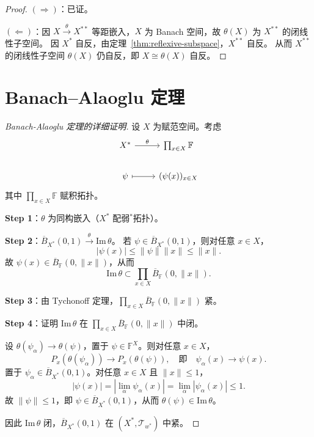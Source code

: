 \documentclass[lang=cn,a4paper,newtx,section]{elegantbook}
\begin{document}
\begin{proof}
  $(\Rightarrow)$：已证。

  $(\Leftarrow)$：因 $X\xrightarrow{\theta}X^{**}$ 等距嵌入，$X$ 为 Banach 空间，故 $\theta(X)$ 为 $X^{**}$ 的闭线性子空间。
  因 $X^*$ 自反，由定理~\ref{thm:reflexive-subspace}，$X^{**}$ 自反。
  从而 $X^{**}$ 的闭线性子空间 $\theta(X)$ 仍自反，即 $X\cong\theta(X)$ 自反。
\end{proof}

\section{Banach--Alaoglu 定理}

\begin{proof}[Banach-Alaoglu 定理的详细证明]
  设 $X$ 为赋范空间。考虑
  \[
    \begin{tikzcd}
      X^* \arrow[r,"\theta"] & \prod_{x\in X}\mathbb{F} \\
      \psi \arrow[r,mapsto] & (\psi(x))_{x\in X}
    \end{tikzcd}
  \]
  其中 $\prod_{x\in X}\mathbb{F}$ 赋积拓扑。

  \textbf{Step 1}：$\theta$ 为同构嵌入（$X^*$ 配弱$^*$拓扑）。

  \textbf{Step 2}：$\overline{B}_{X^*}(0,1)\xrightarrow{\theta}\mathrm{Im}\,\theta$。
  若 $\psi\in\overline{B}_{X^*}(0,1)$，则对任意 $x\in X$，
  \[
    |\psi(x)|\le\|\psi\|\|x\|\le\|x\|.
  \]
  故 $\psi(x)\in\overline{B}_{\mathbb{F}}(0,\|x\|)$，从而
  \[
    \mathrm{Im}\,\theta\subset\prod_{x\in X}\overline{B}_{\mathbb{F}}(0,\|x\|).
  \]

  \textbf{Step 3}：由 Tychonoff 定理，$\prod_{x\in X}\overline{B}_{\mathbb{F}}(0,\|x\|)$ 紧。

  \textbf{Step 4}：证明 $\mathrm{Im}\,\theta$ 在 $\prod_{x\in X}\overline{B}_{\mathbb{F}}(0,\|x\|)$ 中闭。

  设 $\theta(\psi_\alpha)\to\theta(\psi)$，置于 $\psi\in\mathbb{F}^X$。则对任意 $x\in X$，
  \[
    P_x(\theta(\psi_\alpha))\to P_x(\theta(\psi)),\quad\text{即}\quad\psi_\alpha(x)\to\psi(x).
  \]
  置于 $\psi_\alpha\in\overline{B}_{X^*}(0,1)$。对任意 $x\in X$ 且 $\|x\|\le 1$，
  \[
    |\psi(x)|=\left|\lim_{\alpha}\psi_\alpha(x)\right|=\lim_{\alpha}|\psi_\alpha(x)|\le 1.
  \]
  故 $\|\psi\|\le 1$，即 $\psi\in\overline{B}_{X^*}(0,1)$，从而 $\theta(\psi)\in\mathrm{Im}\,\theta$。

  因此 $\mathrm{Im}\,\theta$ 闭，$\overline{B}_{X^*}(0,1)$ 在 $(X^*,\mathcal{T}_{w^*})$ 中紧。
\end{proof}
\end{document}
